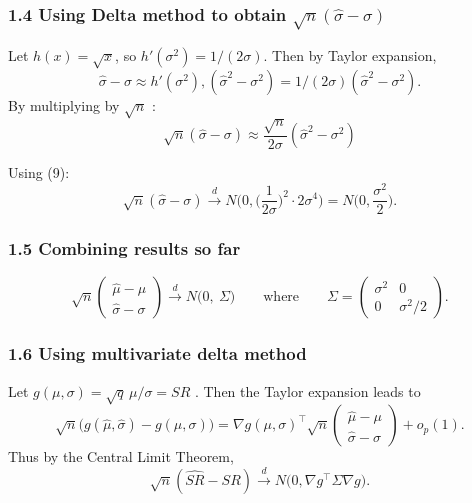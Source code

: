 \documentclass[
  12pt,
]{article}
\begin{document}
\subsubsection{\texorpdfstring{1.4 Using Delta method to obtain
\(\sqrt{n}(\widehat\sigma-\sigma)\)}{1.4 Using Delta method to obtain \textbackslash sqrt\{n\}(\textbackslash widehat\textbackslash sigma-\textbackslash sigma)}}\label{using-delta-method-to-obtain-sqrtnwidehatsigma-sigma}

Let \(h(x)=\sqrt{x}\), so \(h'(\sigma^2)=1/(2\sigma)\). Then by Taylor
expansion, \[ 
\widehat\sigma-\sigma \approx h'(\sigma^2),(\widehat\sigma^2-\sigma^2)=1/(2\sigma)(\widehat\sigma^2-\sigma^2).
\] By multiplying by \(\sqrt{n}\) : \[ 
\sqrt{n}(\widehat\sigma-\sigma) \approx \frac{\sqrt{n}}{2\sigma}(\widehat\sigma^2-\sigma^2) 
\]

Using (9): \[
\sqrt{n}(\widehat\sigma-\sigma)\xrightarrow{d} N\!\Big(0,\Big(\frac{1}{2\sigma}\Big)^2\cdot 2\sigma^4\Big)=N\!\Big(0,\frac{\sigma^2}{2}\Big).
\]

\subsubsection{1.5 Combining results so
far}\label{combining-results-so-far}

\[
\sqrt{n}\begin{pmatrix}\widehat\mu-\mu\\[4pt]\widehat\sigma-\sigma\end{pmatrix}
\xrightarrow{d} N\!\Big(0,\ \Sigma\Big)  \qquad\text{where}\qquad
\Sigma=\begin{pmatrix}\sigma^2 & 0\\[6pt]0 & \sigma^2/2\end{pmatrix}.
\]

\subsubsection{1.6 Using multivariate delta
method}\label{using-multivariate-delta-method}

Let \(g(\mu,\sigma)=\sqrt{q}\,\mu/\sigma = SR\) . Then the Taylor
expansion leads to \[
\sqrt{n}\big(g(\widehat\mu,\widehat\sigma)-g(\mu,\sigma)\big)
= \nabla g(\mu,\sigma)^\top \sqrt{n}\begin{pmatrix}\widehat\mu-\mu\\[4pt]\widehat\sigma-\sigma\end{pmatrix} + o_p(1).
\] Thus by the Central Limit Theorem, \[
\sqrt{n}(\widehat{SR}-SR)\xrightarrow{d} N\!\Big(0,\nabla g^\top\Sigma\nabla g\Big).
\]
\end{document}
